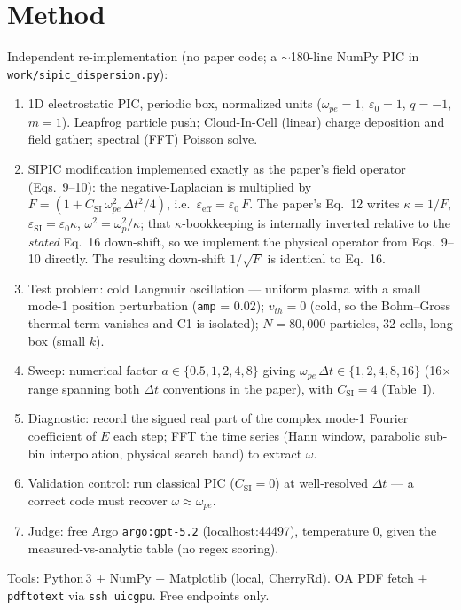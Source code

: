 \documentclass[11pt]{article}
\begin{document}
\section{Method}
Independent re-implementation (no paper code; a $\sim$180-line NumPy PIC
in \texttt{work/sipic\_dispersion.py}):
\begin{enumerate}
  \item 1D electrostatic PIC, periodic box, normalized units
        ($\omega_{pe}=1$, $\varepsilon_0=1$, $q=-1$, $m=1$).
        Leapfrog particle push; Cloud-In-Cell (linear) charge deposition
        and field gather; spectral (FFT) Poisson solve.
  \item SIPIC modification implemented exactly as the paper's field
        operator (Eqs.~9--10): the negative-Laplacian is multiplied by
        $F = (1 + C_{\text{SI}}\,\omega_{pe}^{2}\,\Delta t^{2}/4)$,
        i.e.\ $\varepsilon_{\text{eff}} = \varepsilon_0\,F$. The paper's
        Eq.~12 writes $\kappa = 1/F$, $\varepsilon_{\text{SI}} =
        \varepsilon_0\kappa$, $\omega^{2} = \omega_{p}^{2}/\kappa$; that
        $\kappa$-bookkeeping is internally inverted relative to the
        \emph{stated} Eq.~16 down-shift, so we implement the physical
        operator from Eqs.~9--10 directly. The resulting down-shift
        $1/\sqrt{F}$ is identical to Eq.~16.
  \item Test problem: cold Langmuir oscillation --- uniform plasma with
        a small mode-1 position perturbation (\texttt{amp} = 0.02);
        $v_{th}=0$ (cold, so the Bohm--Gross thermal term vanishes and
        C1 is isolated); $N=80{,}000$ particles, 32 cells, long box
        (small $k$).
  \item Sweep: numerical factor $a\in\{0.5,1,2,4,8\}$ giving
        $\omega_{pe}\,\Delta t\in\{1,2,4,8,16\}$ (16$\times$ range
        spanning both $\Delta t$ conventions in the paper), with
        $C_{\text{SI}}=4$ (Table~I).
  \item Diagnostic: record the signed real part of the complex mode-1
        Fourier coefficient of $E$ each step; FFT the time series (Hann
        window, parabolic sub-bin interpolation, physical search band)
        to extract $\omega$.
  \item Validation control: run classical PIC ($C_{\text{SI}}=0$) at
        well-resolved $\Delta t$ --- a correct code must recover
        $\omega\approx\omega_{pe}$.
  \item Judge: free Argo \texttt{argo:gpt-5.2} (localhost:44497),
        temperature 0, given the measured-vs-analytic table (no regex
        scoring).
\end{enumerate}
Tools: Python\,3 + NumPy + Matplotlib (local, CherryRd). OA PDF fetch +
\texttt{pdftotext} via \texttt{ssh uicgpu}. Free endpoints only.
\end{document}
